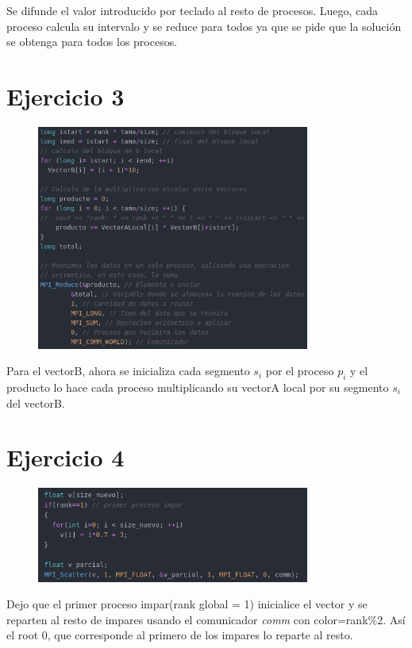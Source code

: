 Se difunde el valor introducido por teclado al resto de procesos. Luego, cada proceso calcula su intervalo y se reduce para todos ya que se pide que la solución se obtenga para todos los procesos.

\section{Ejercicio 3}

\begin{figure}[H]
\centering
\includegraphics[width=0.8\textwidth]{imagenes/ej3.png}
\end{figure}

Para el vectorB, ahora se inicializa cada segmento \textit{$s_i$} por el proceso \textit{$p_i$} y el producto lo hace cada proceso multiplicando su vectorA local por su segmento \textit{$s_i$} del vectorB.

\section{Ejercicio 4}

\begin{figure}[H]
\centering
\includegraphics[width=0.8\textwidth]{imagenes/ej4.png}
\end{figure}

Dejo que el primer proceso impar(rank global = 1) inicialice el vector y se reparten al resto de impares usando el comunicador \textit{comm} con color=rank\%2. Así el root 0, que corresponde al primero de los impares lo reparte al resto. 